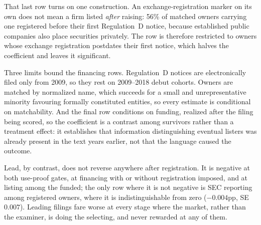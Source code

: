 That last row turns on one construction. An exchange-registration marker on
its own does not mean a firm listed \emph{after} raising: 56\% of matched
owners carrying one registered before their first Regulation~D notice,
because established public companies also place securities privately. The
row is therefore restricted to owners whose exchange registration postdates
their first notice, which halves the coefficient and leaves it significant.

Three limits bound the financing rows. Regulation~D notices are
electronically filed only from 2009, so they rest on 2009--2018 debut
cohorts. Owners are matched by normalized name, which succeeds for a small
and unrepresentative minority favouring formally constituted entities, so
every estimate is conditional on matchability. And the final row conditions
on funding, realized after the filing being scored, so the coefficient is a
contrast among survivors rather than a treatment effect: it establishes that
information distinguishing eventual listers was already present in the text
years earlier, not that the language caused the outcome.

Lead, by contrast, does not reverse anywhere after registration. It is
negative at both use-proof gates, at financing with or without registration
imposed, and at listing among the funded; the only row where it is not negative is
SEC reporting among registered owners, where it is indistinguishable from
zero ($-0.004$pp, SE $0.007$). Leading filings fare worse at every stage where the
market, rather than the examiner, is doing the selecting, and never rewarded
at any of them.

